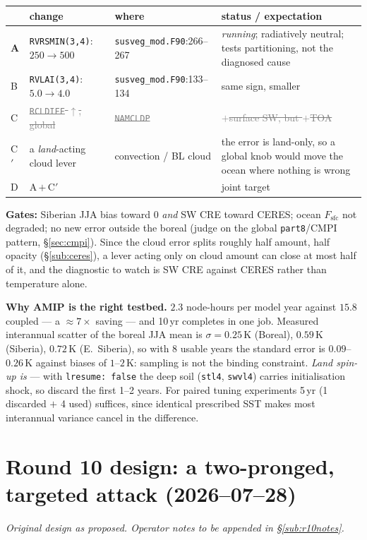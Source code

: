 \documentclass[10pt]{article}
\newcommand{\dead}[1]{\textcolor{gray}{\sout{#1}}}
\begin{document}
\begin{center}\small
\begin{tabular}{l l l l}
\toprule
 & change & where & status / expectation \\
\midrule
\textbf{A} & \texttt{RVRSMIN(3,4)}: $250\to500$ & \texttt{susveg\_mod.F90}:266--267 & \emph{running}; radiatively
neutral; tests partitioning, not the diagnosed cause \\
B & \texttt{RVLAI(3,4)}: $5.0\to4.0$ & \texttt{susveg\_mod.F90}:133--134 & same sign, smaller \\
C & \dead{\texttt{RCLDIFF} $\uparrow$, global} & \dead{\texttt{NAMCLDP}} & \dead{$+$surface SW, but $+$TOA} \\
C$'$ & a \emph{land}-acting cloud lever & convection / BL cloud & the error is land-only, so a global knob
would move the ocean where nothing is wrong \\
D & A\,$+$\,C$'$ & & joint target \\
\bottomrule
\end{tabular}
\end{center}

\textbf{Gates:} Siberian JJA bias toward $0$ \emph{and} SW CRE toward CERES; ocean $F_\mathrm{sfc}$ not
degraded; no new error outside the boreal (judge on the global \texttt{part8}/CMPI pattern, \S\ref{sec:cmpi}).
Since the cloud error splits roughly half amount, half opacity (\S\ref{sub:ceres}), a lever acting only on
cloud amount can close at most half of it, and the diagnostic to watch is SW CRE against CERES rather than
temperature alone.

\textbf{Why AMIP is the right testbed.} $2.3$ node-hours per model year against $15.8$ coupled --- a
$\approx7\times$ saving --- and 10\,yr completes in one job. Measured interannual scatter of the boreal JJA
mean is $\sigma=0.25$\,K (Boreal), $0.59$\,K (Siberia), $0.72$\,K (E.\ Siberia), so with 8 usable years the
standard error is $0.09$--$0.26$\,K against biases of $1$--$2$\,K: sampling is not the binding constraint.
\emph{Land spin-up is} --- with \texttt{lresume:\ false} the deep soil (\texttt{stl4}, \texttt{swvl4}) carries
initialisation shock, so discard the first 1--2 years. For paired tuning experiments 5\,yr (1 discarded
$+$ 4 used) suffices, since identical prescribed SST makes most interannual variance cancel in the difference.

\clearpage
\section{Round 10 design: a two-pronged, targeted attack (2026--07--28)}\label{sec:round10}
\emph{Original design as proposed. Operator notes to be appended in \S\ref{sub:r10notes}.}
\end{document}
